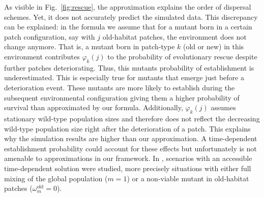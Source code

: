 \documentclass[11pt]{article}
\newcommand{\chg}[1]{\textcolor{change}{#1}}
\begin{document}
As visible in Fig.~\ref{fig:rescue}, the approximation explains the \chg{order of dispersal schemes}. Yet, it does not accurately predict the simulated data. This discrepancy can be explained: in the formula we \chg{assume that for a mutant born in a certain patch configuration, say with $j$ old-habitat patches, the environment does not change anymore. That is, a mutant born in patch-type $k$ (old or new) in this environment contributes $\varphi_{k}(j)$ to the probability of evolutionary rescue despite further patches deteriorating. Thus, this mutants probability of establishment is underestimated. This is especially true for mutants that emerge just before a deterioration event. These mutants are more likely to establish during the subsequent environmental configuration giving them a higher probability of survival than approximated by our formula. Additionally, $\varphi_k(j)$ assumes stationary wild-type population sizes and therefore does not reflect the decreasing wild-type population size right after the deterioration of a patch.} 
This explains why the simulation results are higher than our approximation. 
\chg{A time-dependent establishment probability could account for these effects but unfortunately is not amenable to approximations in our framework.}
\chg{In \citet{uecker_2014}, scenarios with an accessible time-dependent solution were studied, more precisely situations with either full mixing of the global population ($m=1$) or a non-viable mutant in old-habitat patches ($\omega^\text{old}_m=0$).}
\end{document}
